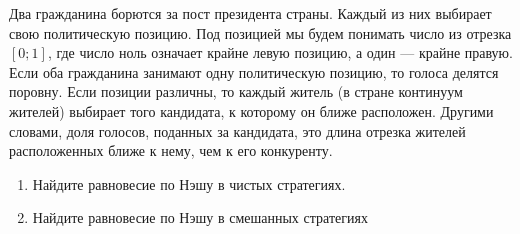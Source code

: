 \begin{problem}
Два гражданина борются за пост президента страны. Каждый из них выбирает свою политическую позицию. Под позицией мы будем понимать число из отрезка  $\left[0;1\right]$, где число ноль означает крайне левую позицию, а один --- крайне правую. Если оба гражданина занимают одну политическую позицию, то голоса делятся поровну. Если позиции различны, то каждый житель (в стране континуум жителей) выбирает того кандидата, к которому он ближе расположен. Другими словами, доля голосов, поданных за кандидата, это длина отрезка жителей расположенных ближе к нему, чем к его конкуренту.
\begin{enumerate}
\item 	Найдите равновесие по Нэшу в чистых стратегиях.

\item 	Найдите равновесие по Нэшу в смешанных стратегиях
\end{enumerate}


\begin{sol}

\end{sol}
\end{problem}



